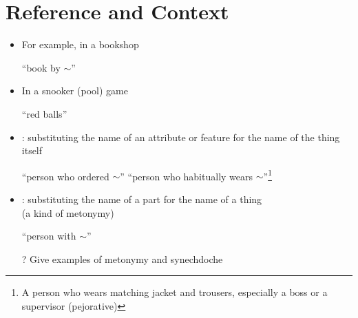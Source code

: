 \documentclass[a4paper,landscape,headrule,footrule,xetex]{foils}
\begin{document}
\section{Reference and Context}
\MyLogo{}


\begin{itemize}\addtolength{\itemsep}{-1.5ex}
\item For example, in a bookshop
  \begin{exe}
    \ex {} \textnormal{``book by $\sim$''}
  \end{exe}
\item In a snooker (pool)  game
  \begin{exe}
    \ex {} ``red balls''
  \end{exe}
\item {}: substituting the name of an attribute or feature for the name of the thing itself
  \begin{exe}
    \ex {} ``person who ordered $\sim$''
    \ex {} ``person who
    habitually wears $\sim$''\footnote{ A person who wears matching
      jacket and trousers, especially a boss or a supervisor (pejorative)}
  \end{exe}
  \item {}: substituting the name of a part for the name of a thing \\
    (a kind of metonymy)
  \begin{exe}
    \ex {} ``person with $\sim$''
  \end{exe}
\item[?] Give examples of metonymy and synechdoche\task

\end{itemize}
\end{document}
